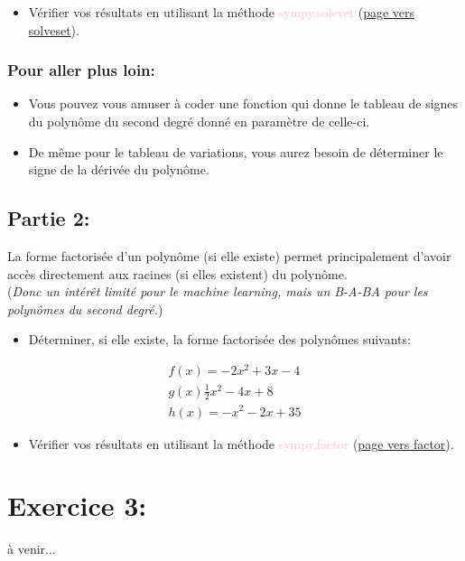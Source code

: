 \documentclass[11pt, french]{article}
\newcommand{\inlsnippet}[1]{\colorbox{gray!10}{\mbox{\textcolor{pink}{#1}}}}
\begin{document}
\begin{itemize}
    \item Vérifier vos résultats en utilisant la méthode \inlsnippet{sympy.solevet} 
(\href{https://docs.sympy.org/latest/modules/solvers/solveset.html}{page vers solveset}).
\end{itemize}

\subsubsection*{Pour aller plus loin:}
\begin{itemize}
\item Vous pouvez vous amuser à coder une fonction qui donne le tableau de signes du polynôme du second degré donné en paramètre de celle-ci.
\item De même pour le tableau de variations, vous aurez besoin de déterminer le signe de la dérivée du polynôme.
\end{itemize}

\subsection*{Partie 2:}
La forme factorisée d'un polynôme (si elle existe) permet principalement d'avoir accès directement aux racines (si elles existent) du polynôme.\\
(\textit{Donc un intérêt limité pour le machine learning, mais un B-A-BA pour les polynômes du second degré.})

\begin{itemize}
\item Déterminer, si elle existe, la forme factorisée des polynômes suivants:
\end{itemize}
\begin{align*}
    f(x) = -2x^2+3x-4 \\
    g(x) \frac{1}{2}x^2 -4x +8 \\
    h(x) = -x^2 -2x +35
\end{align*}
\begin{itemize}
    \item Vérifier vos résultats en utilisant la méthode \inlsnippet{sympy.factor} 
(\href{https://docs.sympy.org/latest/tutorial/simplification.html}{page vers factor}).
\end{itemize}
\vspace{1cm}


\section*{Exercice 3:}
à venir...
\end{document}
